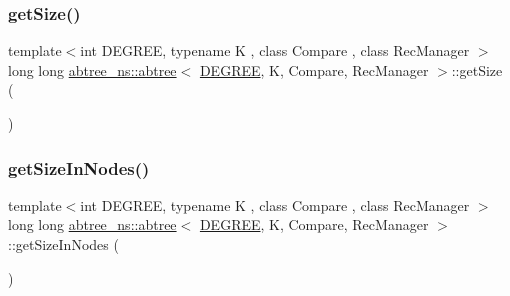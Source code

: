 \mbox{\label{classabtree__ns_1_1abtree_aab64503fd00b60c5badb7bbe492895b1}} 
\subsubsection{\texorpdfstring{get\+Size()}{getSize()}\hspace{0.1cm}{\footnotesize\ttfamily [4/4]}}
{\footnotesize\ttfamily template$<$int D\+E\+G\+R\+EE, typename K , class Compare , class Rec\+Manager $>$ \\
long long \hyperlink{classabtree__ns_1_1abtree}{abtree\+\_\+ns\+::abtree}$<$ \hyperlink{brown__sigouin__abtree__kcas_2adapter_8h_a5d88b17d70c985f2f2b8e987037fd6dd}{D\+E\+G\+R\+EE}, K, Compare, Rec\+Manager $>$\+::get\+Size (\begin{DoxyParamCaption}{ }\end{DoxyParamCaption})\hspace{0.3cm}{\ttfamily [inline]}}

\mbox{\label{classabtree__ns_1_1abtree_af3fa6cabe01588518bf742b6fa951895}} 
\subsubsection{\texorpdfstring{get\+Size\+In\+Nodes()}{getSizeInNodes()}\hspace{0.1cm}{\footnotesize\ttfamily [1/2]}}
{\footnotesize\ttfamily template$<$int D\+E\+G\+R\+EE, typename K , class Compare , class Rec\+Manager $>$ \\
long long \hyperlink{classabtree__ns_1_1abtree}{abtree\+\_\+ns\+::abtree}$<$ \hyperlink{brown__sigouin__abtree__kcas_2adapter_8h_a5d88b17d70c985f2f2b8e987037fd6dd}{D\+E\+G\+R\+EE}, K, Compare, Rec\+Manager $>$\+::get\+Size\+In\+Nodes (\begin{DoxyParamCaption}{ }\end{DoxyParamCaption})\hspace{0.3cm}{\ttfamily [inline]}}

\mbox{\label{classabtree__ns_1_1abtree_af3fa6cabe01588518bf742b6fa951895}} 
